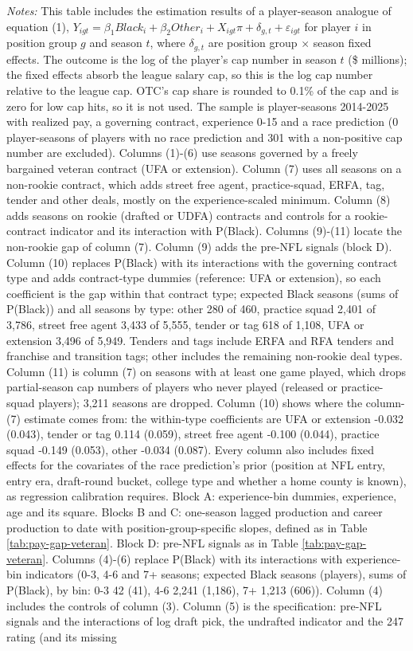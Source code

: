 {\footnotesize
\noindent\textit{Notes:} This table includes the estimation results of a player-season analogue of equation (1), $Y_{igt} = \beta_1 Black_i + \beta_2 Other_i + X_{igt}\pi + \delta_{g,t} + \varepsilon_{igt}$ for player $i$ in position group $g$ and season $t$, where $\delta_{g,t}$ are position group $\times$ season fixed effects. The outcome is the log of the player's cap number in season $t$ (\$ millions); the fixed effects absorb the league salary cap, so this is the log cap number relative to the league cap. OTC's cap share is rounded to 0.1\% of the cap and is zero for low cap hits, so it is not used. The sample is player-seasons 2014-2025 with realized pay, a governing contract, experience 0-15 and a race prediction (0 player-seasons of players with no race prediction and 301 with a non-positive cap number are excluded). Columns (1)-(6) use seasons governed by a freely bargained veteran contract (UFA or extension). Column (7) uses all seasons on a non-rookie contract, which adds street free agent, practice-squad, ERFA, tag, tender and other deals, mostly on the experience-scaled minimum. Column (8) adds seasons on rookie (drafted or UDFA) contracts and controls for a rookie-contract indicator and its interaction with P(Black). Columns (9)-(11) locate the non-rookie gap of column (7). Column (9) adds the pre-NFL signals (block D). Column (10) replaces P(Black) with its interactions with the governing contract type and adds contract-type dummies (reference: UFA or extension), so each coefficient is the gap within that contract type; expected Black seasons (sums of P(Black)) and all seasons by type: other 280 of 460, practice squad 2,401 of 3,786, street free agent 3,433 of 5,555, tender or tag 618 of 1,108, UFA or extension 3,496 of 5,949. Tenders and tags include ERFA and RFA tenders and franchise and transition tags; other includes the remaining non-rookie deal types. Column (11) is column (7) on seasons with at least one game played, which drops partial-season cap numbers of players who never played (released or practice-squad players); 3,211 seasons are dropped. Column (10) shows where the column-(7) estimate comes from: the within-type coefficients are UFA or extension -0.032 (0.043), tender or tag 0.114 (0.059), street free agent -0.100 (0.044), practice squad -0.149 (0.053), other -0.034 (0.087). Every column also includes fixed effects for the covariates of the race prediction's prior (position at NFL entry, entry era, draft-round bucket, college type and whether a home county is known), as regression calibration requires. Block A: experience-bin dummies, experience, age and its square. Blocks B and C: one-season lagged production and career production to date with position-group-specific slopes, defined as in Table \ref{tab:pay-gap-veteran}. Block D: pre-NFL signals as in Table \ref{tab:pay-gap-veteran}. Columns (4)-(6) replace P(Black) with its interactions with experience-bin indicators (0-3, 4-6 and 7+ seasons; expected Black seasons (players), sums of P(Black), by bin: 0-3 42 (41), 4-6 2,241 (1,186), 7+ 1,213 (606)). Column (4) includes the controls of column (3). Column (5) is the \citet{altonji2001employer} specification: pre-NFL signals and the interactions of log draft pick, the undrafted indicator and the 247 rating (and its missing }
